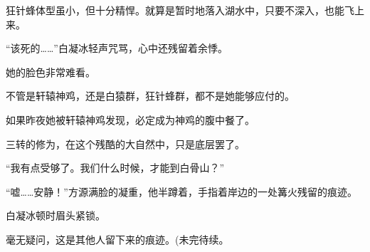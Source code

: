 \begin{this_body}
狂针蜂体型虽小，但十分精悍。就算是暂时地落入湖水中，只要不深入，也能飞上来。

“该死的……”白凝冰轻声咒骂，心中还残留着余悸。

她的脸色非常难看。

不管是轩辕神鸡，还是白猿群，狂针蜂群，都不是她能够应付的。

如果昨夜她被轩辕神鸡发现，必定成为神鸡的腹中餐了。

三转的修为，在这个残酷的大自然中，只是底层罢了。

“我有点受够了。我们什么时候，才能到白骨山？”

“嘘……安静！”方源满脸的凝重，他半蹲着，手指着岸边的一处篝火残留的痕迹。

白凝冰顿时眉头紧锁。

毫无疑问，这是其他人留下来的痕迹。(未完待续。

\end{this_body}

